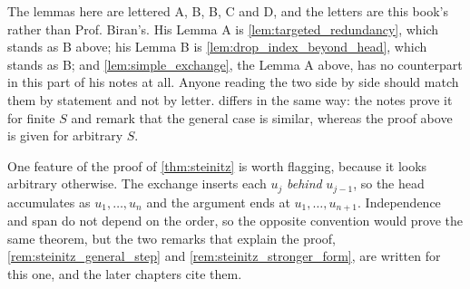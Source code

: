 \begin{ainote}
The lemmas here are lettered A, B, B\textquotesingle, C and D, and the letters
are this book's rather than Prof. Biran's. His Lemma A is
\cref{lem:targeted_redundancy}, which stands as B above; his Lemma B is
\cref{lem:drop_index_beyond_head}, which stands as B\textquotesingle; and
\cref{lem:simple_exchange}, the Lemma A above, has no counterpart in this part
of his notes at all. Anyone reading the two side by side should match them by
statement and not by letter.  differs in the
same way: the notes prove it for finite $S$ and remark that the general case is
similar, whereas the proof above is given for arbitrary $S$.

One feature of the proof of \cref{thm:steinitz} is worth flagging, because it
looks arbitrary otherwise. The exchange inserts each $u_j$ \emph{behind}
$u_{j-1}$, so the head accumulates as $u_1, \dots, u_n$ and the argument ends at
$u_1, \dots, u_{n+1}$. Independence and span do not depend on the order, so the
opposite convention would prove the same theorem, but the two remarks that
explain the proof, \cref{rem:steinitz_general_step} and
\cref{rem:steinitz_stronger_form}, are written for this one, and the later
chapters cite them.
\end{ainote}


